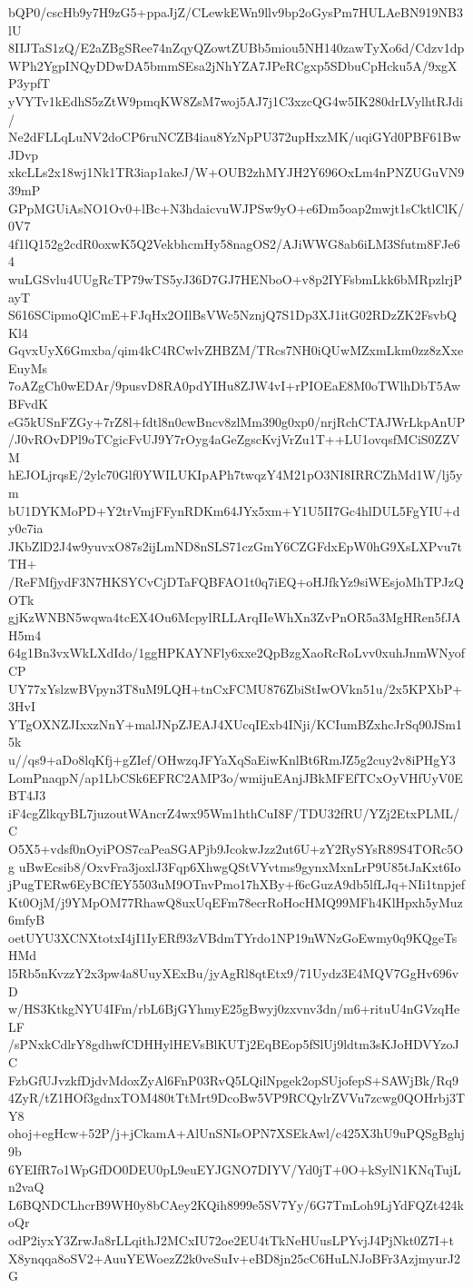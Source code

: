 bQP0/cscHb9y7H9zG5+ppaJjZ/CLewkEWn9llv9bp2oGysPm7HULAeBN919NB3lU
8IIJTaS1zQ/E2aZBgSRee74nZqyQZowtZUBb5miou5NH140zawTyXo6d/Cdzv1dp
WPh2YgpINQyDDwDA5bmmSEsa2jNhYZA7JPeRCgxp5SDbuCpHcku5A/9xgXP3ypfT
yVYTv1kEdhS5zZtW9pmqKW8ZsM7woj5AJ7j1C3xzcQG4w5IK280drLVylhtRJdi/
Ne2dFLLqLuNV2doCP6ruNCZB4iau8YzNpPU372upHxzMK/uqiGYd0PBF61BwJDvp
xkcLLs2x18wj1Nk1TR3iap1akeJ/W+OUB2zhMYJH2Y696OxLm4nPNZUGuVN939mP
GPpMGUiAsNO1Ov0+lBc+N3hdaicvuWJPSw9yO+e6Dm5oap2mwjt1sCktlClK/0V7
4f1lQ152g2cdR0oxwK5Q2VekbhcmHy58nagOS2/AJiWWG8ab6iLM3Sfutm8FJe64
wuLGSvlu4UUgRcTP79wTS5yJ36D7GJ7HENboO+v8p2IYFsbmLkk6bMRpzlrjPayT
S616SCipmoQlCmE+FJqHx2OIlBsVWc5NznjQ7S1Dp3XJ1itG02RDzZK2FsvbQKl4
GqvxUyX6Gmxba/qim4kC4RCwlvZHBZM/TRcs7NH0iQUwMZxmLkm0zz8zXxeEuyMs
7oAZgCh0wEDAr/9pusvD8RA0pdYIHu8ZJW4vI+rPIOEaE8M0oTWlhDbT5AwBFvdK
eG5kUSnFZGy+7rZ8l+fdtl8n0cwBncv8zlMm390g0xp0/nrjRchCTAJWrLkpAnUP
/J0vROvDPl9oTCgicFvUJ9Y7rOyg4aGeZgscKvjVrZu1T++LU1ovqsfMCiS0ZZVM
hEJOLjrqsE/2ylc70Glf0YWILUKIpAPh7twqzY4M21pO3NI8IRRCZhMd1W/lj5ym
bU1DYKMoPD+Y2trVmjFFynRDKm64JYx5xm+Y1U5II7Gc4hlDUL5FgYIU+dy0c7ia
JKbZlD2J4w9yuvxO87s2ijLmND8nSLS71czGmY6CZGFdxEpW0hG9XsLXPvu7tTH+
/ReFMfjydF3N7HKSYCvCjDTaFQBFAO1t0q7iEQ+oHJfkYz9siWEsjoMhTPJzQOTk
gjKzWNBN5wqwa4tcEX4Ou6McpylRLLArqIIeWhXn3ZvPnOR5a3MgHRen5fJAH5m4
64g1Bn3vxWkLXdIdo/1ggHPKAYNFly6xxe2QpBzgXaoRcRoLvv0xuhJnmWNyofCP
UY77xYslzwBVpyn3T8uM9LQH+tnCxFCMU876ZbiStIwOVkn51u/2x5KPXbP+3HvI
YTgOXNZJIxxzNnY+malJNpZJEAJ4XUcqIExb4INji/KCIumBZxhcJrSq90JSm15k
u//qs9+aDo8lqKfj+gZIef/OHwzqJFYaXqSaEiwKnlBt6RmJZ5g2cuy2v8iPHgY3
LomPnaqpN/ap1LbCSk6EFRC2AMP3o/wmijuEAnjJBkMFEfTCxOyVHfUyV0EBT4J3
iF4cgZlkqyBL7juzoutWAncrZ4wx95Wm1hthCuI8F/TDU32fRU/YZj2EtxPLML/C
O5X5+vdsf0nOyiPOS7caPeaSGAPjb9JcokwJzz2ut6U+zY2RySYsR89S4TORc5Og
uBwEcsib8/OxvFra3joxlJ3Fqp6XhwgQStVYvtms9gynxMxnLrP9U85tJaKxt6Io
jPugTERw6EyBCfEY5503uM9OTnvPmo17hXBy+f6cGuzA9db5lfLJq+NIi1tnpjef
Kt0OjM/j9YMpOM77RhawQ8uxUqEFm78ecrRoHocHMQ99MFh4KlHpxh5yMuz6mfyB
oetUYU3XCNXtotxI4jI1IyERf93zVBdmTYrdo1NP19nWNzGoEwmy0q9KQgeTsHMd
l5Rb5nKvzzY2x3pw4a8UuyXExBu/jyAgRl8qtEtx9/71Uydz3E4MQV7GgHv696vD
w/HS3KtkgNYU4IFm/rbL6BjGYhmyE25gBwyj0zxvnv3dn/m6+rituU4nGVzqHeLF
/sPNxkCdlrY8gdhwfCDHHylHEVsBlKUTj2EqBEop5fSlUj9ldtm3sKJoHDVYzoJC
FzbGfUJvzkfDjdvMdoxZyAl6FnP03RvQ5LQilNpgek2opSUjofepS+SAWjBk/Rq9
4ZyR/tZ1HOf3gdnxTOM480tTtMrt9DcoBw5VP9RCQylrZVVu7zcwg0QOHrbj3TY8
ohoj+egHcw+52P/j+jCkamA+AlUnSNIsOPN7XSEkAwl/c425X3hU9uPQSgBghj9b
6YEIfR7o1WpGfDO0DEU0pL9euEYJGNO7DIYV/Yd0jT+0O+kSylN1KNqTujLn2vaQ
L6BQNDCLhcrB9WH0y8bCAey2KQih8999e5SV7Yy/6G7TmLoh9LjYdFQZt424koQr
odP2iyxY3ZrwJa8rLLqithJ2MCxIU72oe2EU4tTkNeHUusLPYvjJ4PjNkt0Z7I+t
X8ynqqa8oSV2+AuuYEWoezZ2k0veSuIv+eBD8jn25cC6HuLNJoBFr3AzjmyurJ2G
